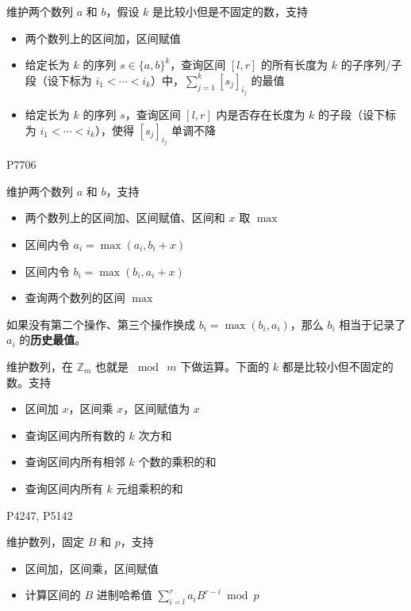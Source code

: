 \begin{exercise}[最值]
    维护两个数列 $a$ 和 $b$，假设 $k$ 是比较小但是不固定的数，支持
    \begin{itemize}
        \item 两个数列上的区间加，区间赋值
        \item 给定长为 $k$ 的序列 $s\in\{a,b\}^k$，查询区间 $[l,r]$ 的所有长度为 $k$ 的子序列/子段（设下标为 $i_1<\cdots<i_k$）中，$\sum_{j=1}^k [s_j]_{i_j}$ 的最值
        \item 给定长为 $k$ 的序列 $s$，查询区间 $[l,r]$ 内是否存在长度为 $k$ 的子段（设下标为 $i_1<\cdots<i_k$），使得 $[s_j]_{i_j}$ 单调不降
    \end{itemize}    
    P7706
\end{exercise}

\begin{exercise}[历史最值]
    维护两个数列 $a$ 和 $b$，支持
    \begin{itemize}
        \item 两个数列上的区间加、区间赋值、区间和 $x$ 取 $\max$
        \item 区间内令 $a_i=\max(a_i,b_i+x)$
        \item 区间内令 $b_i=\max(b_i,a_i+x)$
        \item 查询两个数列的区间 $\max$
    \end{itemize}
\end{exercise}
\begin{remark}
    如果没有第二个操作、第三个操作换成 $b_i=\max(b_i,a_i)$，那么 $b_i$ 相当于记录了 $a_i$ 的\textbf{历史最值}。
\end{remark}

\begin{exercise}[数列]
    维护数列，在 $\mathbb Z_m$ 也就是 $\bmod\  m$ 下做运算。下面的 $k$ 都是比较小但不固定的数。支持
    \begin{itemize}
        \item 区间加 $x$，区间乘 $x$，区间赋值为 $x$
        \item 查询区间内所有数的 $k$ 次方和
        \item 查询区间内所有相邻 $k$ 个数的乘积的和
        \item 查询区间内所有 $k$ 元组乘积的和
    \end{itemize}
    P4247, P5142
\end{exercise}

\begin{exercise}[哈希]
    维护数列，固定 $B$ 和 $p$，支持
    \begin{itemize}
        \item 区间加，区间乘，区间赋值
        \item 计算区间的 $B$ 进制哈希值 $\sum_{i=l}^r a_i B^{r-i}\bmod p$
    \end{itemize}
\end{exercise}

